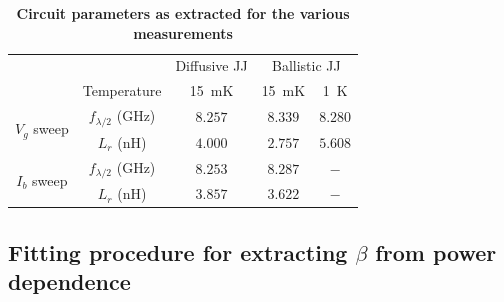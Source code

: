 \begin{table}[!h]
	\centering
	\caption{\textbf{Circuit parameters as extracted for the various measurements}}
	\begin{tabular}{ccccc}
		\hline\hline
		& & Diffusive JJ & \multicolumn{2}{c}{Ballistic JJ}  \\
		& Temperature & \SI{15}{\milli\kelvin} & \SI{15}{\milli\kelvin} & \SI{1}{\kelvin} \\
		\hline
		\multirow{ 2}{*}{$V_g$ sweep} & $f_{\lambda/2}$ (\si{\giga\hertz}) & $8.257$ & $8.339$ & $8.280$ \\
		& $L_r$ (\si{\nano\henry}) & $4.000$ & $2.757$ & $5.608$ \\
		\hline
		\multirow{ 2}{*}{$I_b$ sweep} & $f_{\lambda/2}$ (\si{\giga\hertz}) & $8.253$ & $8.287$ & $-$ \\
		& $L_r$ (\si{\nano\henry}) & $3.857$ & $3.622$ & $-$ \\
		\hline\hline
	\end{tabular}
	\label{tab:frLr}
\end{table}



\subsection{Fitting procedure for extracting $\beta$ from power dependence}\label{sec:SMduffing}

